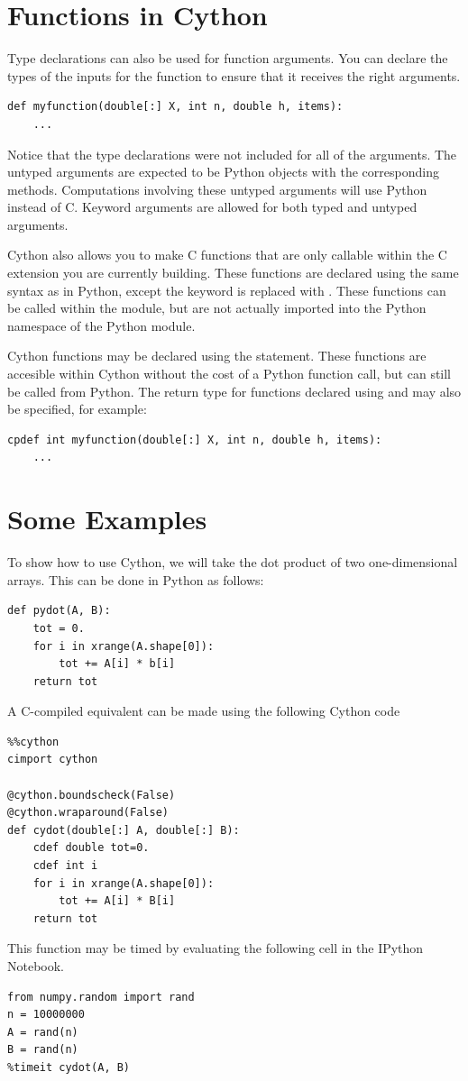 \section*{Functions in Cython}
Type declarations can also be used for function arguments.
You can declare the types of the inputs for the function to ensure that it receives the right arguments.
\begin{lstlisting}
def myfunction(double[:] X, int n, double h, items):
    ...
\end{lstlisting}
Notice that the type declarations were not included for all of the arguments.
The untyped arguments are expected to be Python objects with the corresponding methods.
Computations involving these untyped arguments will use Python instead of C.
Keyword arguments are allowed for both typed and untyped arguments.

Cython also allows you to make C functions that are only callable within the C extension you are currently building.
These functions are declared using the same syntax as in Python, except the keyword  is replaced with .
These functions can be called within the module, but are not actually imported into the Python namespace of the Python module.

Cython functions may be declared using the  statement.
These functions are accesible within Cython without the cost of a Python function call, but can still be called from Python.
The return type for functions declared using  and  may also be specified, for example:
\begin{lstlisting}
cpdef int myfunction(double[:] X, int n, double h, items):
    ...
\end{lstlisting}

\section*{Some Examples}
To show how to use Cython, we will take the dot product of two one-dimensional arrays.
This can be done in Python as follows:
\begin{lstlisting}
def pydot(A, B):
    tot = 0.
    for i in xrange(A.shape[0]):
        tot += A[i] * b[i]
    return tot
\end{lstlisting}
A C-compiled equivalent can be made using the following Cython code
\begin{lstlisting}
%%cython
cimport cython

@cython.boundscheck(False)
@cython.wraparound(False)
def cydot(double[:] A, double[:] B):
    cdef double tot=0.
    cdef int i
    for i in xrange(A.shape[0]):
        tot += A[i] * B[i]
    return tot
\end{lstlisting}
This function may be timed by evaluating the following cell in the IPython Notebook.
\begin{lstlisting}
from numpy.random import rand
n = 10000000
A = rand(n)
B = rand(n)
%timeit cydot(A, B)
\end{lstlisting}

